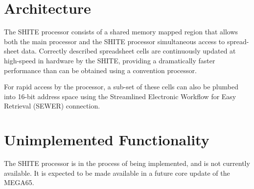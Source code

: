 \section{Architecture}

The SHITE processor consists of a shared memory mapped region that
allows both the main processor and the SHITE processor simultaneous
access to spread-sheet data.  Correctly described spreadsheet cells
are continuously updated at high-speed in hardware by the SHITE, providing a
dramatically faster performance than can be obtained using a
convention processor.

For rapid access by the processor, a sub-set of these cells can also
be plumbed into 16-bit address space using the Streamlined Electronic
Workflow for Easy Retrieval (SEWER) connection.

\section{Unimplemented Functionality}
The SHITE processor is in the process of being implemented, and is not
currently available. It is expected to be made available in a future
core update of the MEGA65.
